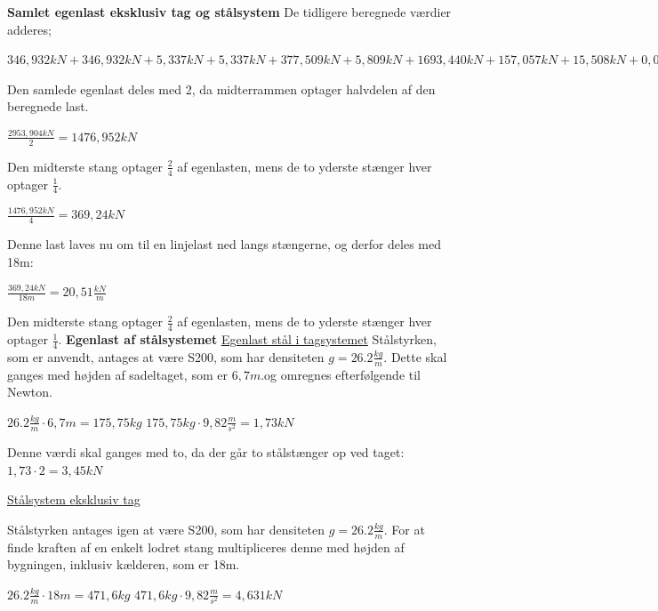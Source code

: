 \textbf{Samlet egenlast eksklusiv tag og stålsystem}
\newline
De tidligere beregnede værdier adderes; 
\begin{center}
	$346,\!932 kN + 346,\!932 kN + 5,\!337 kN + 5,\!337 kN + 377,\!509 kN + 5,\!809 kN + 1693,\!440 kN + 157,\!057 kN + 15,\!508 kN + 0,\!043 kN = 2953,\!904 kN$
\end{center}
Den samlede egenlast deles med 2, da midterrammen optager halvdelen af den beregnede last. 
\begin{center}
	$\frac{2953,904 kN}{2} =  1476,\!952 kN$
\end{center}
Den midterste stang optager $\frac{2}{4}$ af egenlasten, mens de to yderste stænger hver optager $\frac{1}{4}$.
\begin{center}
	$\frac{1476,952 kN}{4} =  369,\!24 kN$
\end{center}
Denne last laves nu om til en linjelast ned langs stængerne, og derfor deles med 18m: 
\begin{center}
	$\frac{369,24 kN}{18m} =  20,\!51 \frac{kN}{m}$
\end{center}

Den midterste stang optager $\frac{2}{4}$ af egenlasten, mens de to yderste stænger hver optager $\frac{1}{4}$. 
\newline
\newline
\textbf{Egenlast af stålsystemet}
\newline
\underline{Egenlast stål i tagsystemet}
\newline
Stålstyrken, som er anvendt, antages at være S200, som har densiteten $g=26.2\frac{kg}{m}$. Dette skal ganges med højden af sadeltaget, som er $6,\!7m$.og omregnes efterfølgende til Newton.  
\begin{center}
	$26.2\frac{kg}{m}\cdot 6,\!7m = 175,\!75 kg$
	$175,\!75 kg\cdot 9,\! 82\frac{m}{s^2} = 1,\! 73 kN$
\end{center}
Denne værdi skal ganges med to, da der går to stålstænger op ved taget:
$1,\! 73 \cdot 2 = 3,\! 45 kN$


\underline{Stålsystem eksklusiv tag}
\newline

Stålstyrken antages igen at være S200, som har densiteten $g=26.2\frac{kg}{m}$. For at finde kraften af en enkelt lodret stang multipliceres denne med højden af bygningen, inklusiv kælderen, som er 18m.
\begin{center}
	$26.2\frac{kg}{m}\cdot 18m = 471,\!6 kg$
	$471,\!6 kg \cdot 9,\!82\frac{m}{s^2} = 4,\! 631 kN$
\end{center}

